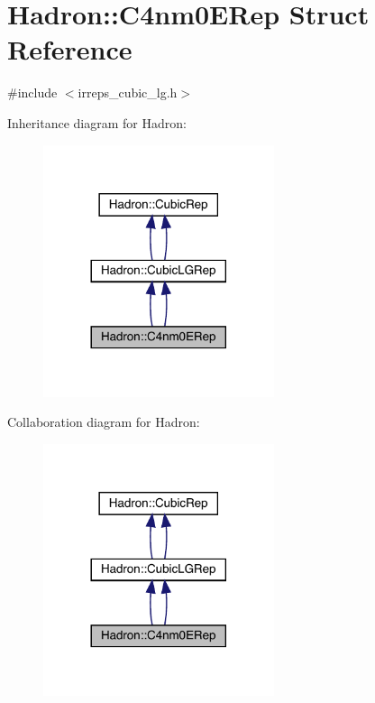 \hypertarget{structHadron_1_1C4nm0ERep}{}\section{Hadron\+:\+:C4nm0\+E\+Rep Struct Reference}
\label{structHadron_1_1C4nm0ERep}


{\ttfamily \#include $<$irreps\+\_\+cubic\+\_\+lg.\+h$>$}



Inheritance diagram for Hadron\+:\nopagebreak
\begin{figure}[H]
\begin{center}
\leavevmode
\includegraphics[width=192pt]{d6/d30/structHadron_1_1C4nm0ERep__inherit__graph}
\end{center}
\end{figure}


Collaboration diagram for Hadron\+:\nopagebreak
\begin{figure}[H]
\begin{center}
\leavevmode
\includegraphics[width=192pt]{d4/d8e/structHadron_1_1C4nm0ERep__coll__graph}
\end{center}
\end{figure}
